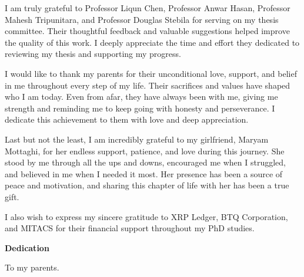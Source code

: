 I am truly grateful to Professor Liqun Chen, Professor Anwar Hasan, Professor Mahesh Tripunitara, and Professor Douglas Stebila for serving on my thesis committee. Their thoughtful feedback and valuable suggestions helped improve the quality of this work. I deeply appreciate the time and effort they dedicated to reviewing my thesis and supporting my progress.

I would like to thank my parents for their unconditional love, support, and belief in me throughout every step of my life. Their sacrifices and values have shaped who I am today. Even from afar, they have always been with me, giving me strength and reminding me to keep going with honesty and perseverance. I dedicate this achievement to them with love and deep appreciation.

Last but not the least, I am incredibly grateful to my girlfriend, Maryam Mottaghi, for her endless support, patience, and love during this journey. She stood by me through all the ups and downs, encouraged me when I struggled, and believed in me when I needed it most. Her presence has been a source of peace and motivation, and sharing this chapter of life with her has been a true gift.

I also wish to express my sincere gratitude to XRP Ledger, BTQ Corporation, and MITACS for their financial support throughout my PhD studies.

\cleardoublepage
{}    %

\begin{center}\textbf{Dedication}\end{center}

To my parents.
\cleardoublepage
{}    %

\renewcommand\contentsname{Table of Contents}
\tableofcontents
\cleardoublepage
{}    %

\listoffigures
\cleardoublepage
{}		%

\listoftables
\cleardoublepage
{}		%

\renewcommand*{\abbreviationsname}{List of Abbreviations}
\printglossary[type=abbreviations]
\cleardoublepage
{}		%

\printglossary[type=symbols]
\cleardoublepage
{}		%



